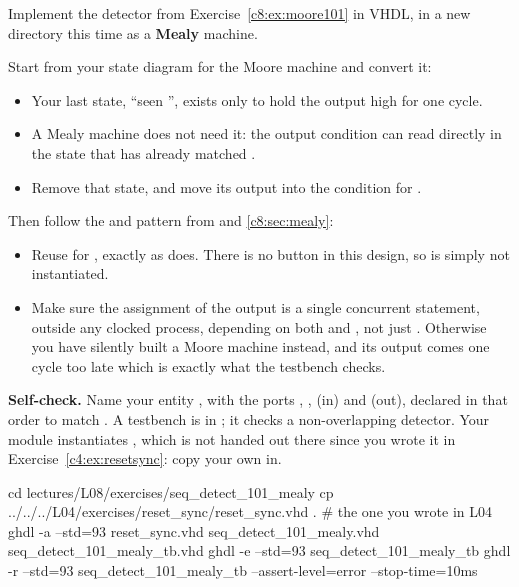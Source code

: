 \label{c8:ex:mealy101}
Implement the  detector from Exercise~\ref{c8:ex:moore101} in VHDL, in a new directory
 \textemdash{} this time as a \textbf{Mealy} machine.

Start from your state diagram for the Moore machine and convert it:
\begin{itemize}
  \item Your last state, ``seen '', exists only to hold the output high for one cycle.
  \item A Mealy machine does not need it: the output condition can read  directly in the
    state that has already matched .
  \item Remove that state, and move its output into the condition for .
\end{itemize}

Then follow the  and  pattern from  and
\ref{c8:sec:mealy}:
\begin{itemize}
  \item Reuse  for , exactly as  does.
    There is no button in this design, so  is simply not instantiated.
  \item Make sure the assignment of the output  is a single concurrent statement, outside
    any clocked process, depending on both  and , not just .
    Otherwise you have silently built a Moore machine instead, and its output comes one cycle too
    late \textemdash{} which is exactly what the testbench checks.
\end{itemize}


\begin{selfcheck}
\textbf{Self-check.} Name your entity , with the ports ,
,  (in) and  (out), declared in that order to match
. A testbench is in ; it checks a
non-overlapping  detector. Your module instantiates , which is not handed
out there since you wrote it in Exercise~\ref{c4:ex:resetsync}: copy your own in.

\begin{shell}
cd lectures/L08/exercises/seq_detect_101_mealy
cp ../../../L04/exercises/reset_sync/reset_sync.vhd .     # the one you wrote in L04
ghdl -a --std=93 reset_sync.vhd seq_detect_101_mealy.vhd seq_detect_101_mealy_tb.vhd
ghdl -e --std=93 seq_detect_101_mealy_tb
ghdl -r --std=93 seq_detect_101_mealy_tb --assert-level=error --stop-time=10ms
\end{shell}
\end{selfcheck}

